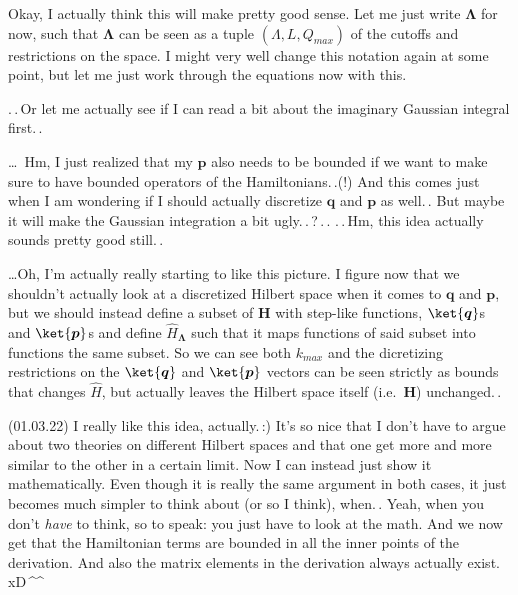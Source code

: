 \documentclass{report}
\begin{document}
Okay, I actually think this will make pretty good sense. Let me just write $\boldsymbol \Lambda$ for now, such that $\boldsymbol \Lambda$ can be seen as a tuple $(\Lambda, L, Q_{max})$ of the cutoffs and restrictions on the space. I might very well change this notation again at some point, but let me just work through the equations now with this.

.\,.\,Or let me actually see if I can read a bit about the imaginary Gaussian integral first.\,. 


\ldots\ Hm, I just realized that my $\boldsymbol p$ also needs to be bounded if we want to make sure to have bounded operators of the Hamiltonians.\,.(!) And this comes just when I am wondering if I should actually discretize $\boldsymbol q$ and $\boldsymbol p$ as well.\,. But maybe it will make the Gaussian integration a bit ugly.\,.\,?\,.\,. .\,.\,Hm, this idea actually sounds pretty good still.\,. 

\ldots Oh, I'm actually really starting to like this picture. I figure now that we shouldn't actually look at a discretized Hilbert space when it comes to $\boldsymbol q$ and $\boldsymbol p$, but we should instead define a subset of \textbf{H} with step-like functions, $\ket{\boldsymbol{q}}$s and $\ket{\boldsymbol{p}}$s and define $\hat H_{\boldsymbol{\Lambda}}$ such that it maps functions of said subset into functions the same subset. So we can see both $k_{max}$ and the dicretizing restrictions on the $\ket{\boldsymbol{q}}$ and $\ket{\boldsymbol{p}}$ vectors can be seen strictly as bounds that changes $\hat H$, but actually leaves the Hilbert space itself (i.e.\ \textbf{H}) unchanged.\,. 

(01.03.22) I really like this idea, actually.\,:) It's so nice that I don't have to argue about two theories on different Hilbert spaces and that one get more and more similar to the other in a certain limit. Now I can instead just show it mathematically. Even though it is really the same argument in both cases, it just becomes much simpler to think about (or so I think), when.\,. Yeah, when you don't \emph{have} to think, so to speak: you just have to look at the math. And we now get that the Hamiltonian terms are bounded in all the inner points of the derivation. And also the matrix elements in the derivation always actually exist.\,xD\,\textasciicircum\textasciicircum
\end{document}
